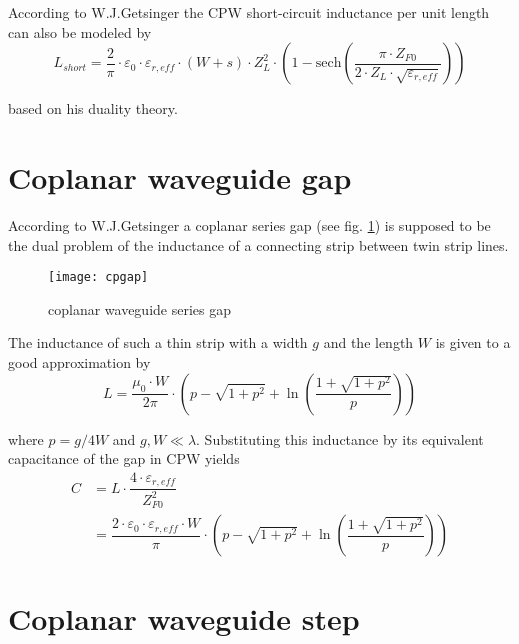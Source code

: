 \addvspace{12pt}

According to W.J.Getsinger \cite{Getsinger6} the CPW short-circuit
inductance per unit length can also be modeled by
\begin{equation}
L_{short} = \dfrac{2}{\pi}\cdot \varepsilon_0 \cdot \varepsilon_{r,eff} \cdot \left(W + s\right)\cdot Z_L^2\cdot \left(1 - \text{sech} \left(\dfrac{\pi\cdot Z_{F0}}{2\cdot Z_L\cdot \sqrt{\varepsilon_{r,eff}}}\right)\right)
\end{equation}

based on his duality \cite{Getsinger5} theory.

\section{Coplanar waveguide gap}

According to W.J.Getsinger \cite{Getsinger5} a coplanar series gap
(see fig. \ref{fig:CPWgap}) is supposed to be the dual problem of the
inductance of a connecting strip between twin strip lines.

\begin{figure}[ht]
\begin{center}
\texttt{[image: cpgap]}
\end{center}
\caption{coplanar waveguide series gap}
\label{fig:CPWgap}
\end{figure}
\FloatBarrier

The inductance of such a thin strip with a width $g$ and the length
$W$ is given to a good approximation by
\begin{equation}
L = \dfrac{\mu_0\cdot W}{2\pi}\cdot\left(p - \sqrt{1 + p^2} + \ln{\left(\dfrac{1 + \sqrt{1 + p^2}}{p}\right)}\right)
\end{equation}

where $p = g/4W$ and $g,W \ll \lambda$.  Substituting this inductance
by its equivalent capacitance of the gap in CPW yields
\begin{equation}
\begin{split}
C &= L \cdot \dfrac{4\cdot \varepsilon_{r,eff}}{Z_{F0}^2}\\
  &= \dfrac{2\cdot\varepsilon_0\cdot\varepsilon_{r,eff}\cdot W}{\pi}\cdot\left(p - \sqrt{1 + p^2} + \ln{\left(\dfrac{1 + \sqrt{1 + p^2}}{p}\right)}\right)
\end{split}
\end{equation}

\section{Coplanar waveguide step}

